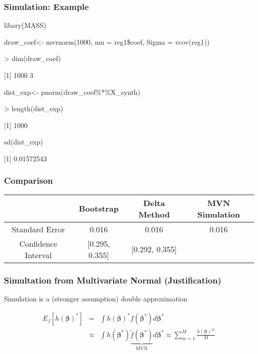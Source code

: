 \documentclass{beamer}
\begin{document}
\begin{frame}
\frametitle{Simulation: Example}


\begin{semiverbatim}
libary(MASS)

draw\_coef<- mvrnorm(1000, mu = reg1\$coef, Sigma = vcov(reg1))

> dim(draw\_coef)

[1] 1000    3


dist\_exp<- pnorm(draw\_coef\%*\%X\_synth)

> length(dist\_exp)

[1] 1000


sd(dist\_exp)

[1] 0.01572543

\end{semiverbatim}


\end{frame}


\begin{frame}
\frametitle{Comparison}

\begin{tabular}{cccc}
\hline
	& Bootstrap & Delta Method & MVN Simulation \\
\hline	
Standard Error      &  0.016			 & 	0.016	      &  0.016\\
Confidence Interval & [0.295, 0.355]	 & [0.292, 0.355] &   \\
\hline
\end{tabular}



\end{frame}



\begin{frame}
\frametitle{Simultation from Multivariate Normal (Justification)}


Simulation is a (stronger assumption) double approximation

\begin{eqnarray}
E_{f}[h(\boldsymbol{\beta})^{*} ] & = & \int h(\boldsymbol{\beta})^{*} f(\boldsymbol{\beta}^{*})d\boldsymbol{\beta}^{*} \nonumber \\
& \approx & \int h(\boldsymbol{\beta}^{*}) \underbrace{\tilde{f}(\boldsymbol{\beta}^{*})}_{\text{MVN}}d\boldsymbol{\beta}^{*} \approx \sum_{m=1}^{M} \frac{h(\boldsymbol{\beta})^{m} }{M} \nonumber 
\end{eqnarray}


\end{frame}
\end{document}
